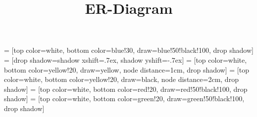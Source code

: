 \documentclass{article}
\title{ER-Diagram}
\begin{document}
\usetikzlibrary{positioning}
\usetikzlibrary{shadows}

 = [top color=white, bottom color=blue!30, 
                          		  draw=blue!50!black!100, drop shadow]
 = [drop shadow={shadow xshift=.7ex, 
                                shadow yshift=-.7ex}]
 = [top color=white, bottom color=yellow!20, 
                               draw=yellow, node distance=1cm, drop shadow]
 = [top color=white, bottom color=yellow!20, 
                               draw=black, node distance=2cm, drop shadow]
 = [top color=white, bottom color=red!20, 
                                  draw=red!50!black!100, drop shadow]
 = [top color=white, bottom color=green!20, 
                         draw=green!50!black!100, drop shadow]
\end{document}
